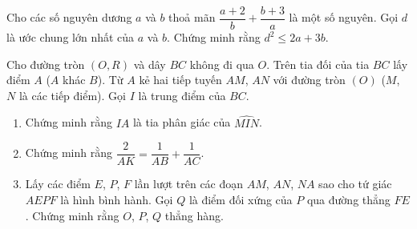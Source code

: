 \begin{ex}%
Cho các số nguyên dương $a$ và $b$ thoả mãn $\dfrac{a+2}{b}+\dfrac{b+3}{a}$ là một số nguyên. Gọi $d$ là ước chung lớn nhất của $a$ và $b$. Chứng minh rằng $d^2 \le 2a+3b$.
\end{ex}

\begin{ex}%
Cho đường tròn $(O,R)$ và dây $BC$ không đi qua $O$. Trên tia đối của tia $BC$ lấy điểm $A$ ($A$ khác $B$). Từ $A$ kẻ hai tiếp tuyến $AM$, $AN$ với đường tròn $(O)$ ($M$, $N$ là các tiếp điểm). Gọi $I$ là trung điểm của $BC$.
\begin{enumerate}
\item Chứng minh rằng $IA$ là tia phân giác của $\widehat{MIN}$.
\item Chứng minh rằng $\dfrac{2}{AK}=\dfrac{1}{AB}+\dfrac{1}{AC}$.
\item Lấy các điểm $E$, $P$, $F$ lần lượt trên các đoạn $AM$, $AN$, $NA$ sao cho tứ giác $AEPF$ là hình bình hành. Gọi $Q$ là điểm đối xứng của $P$ qua đường thẳng $FE$. Chứng minh rằng $O$, $P$, $Q$ thẳng hàng.
\end{enumerate}
\end{ex}
